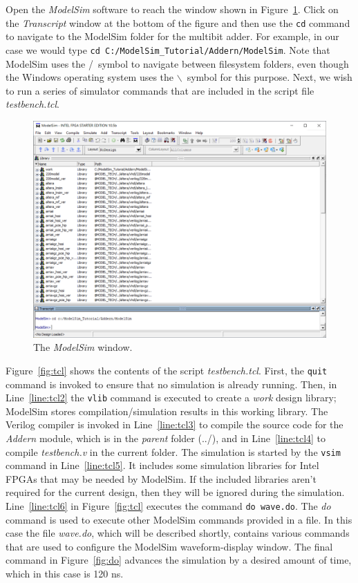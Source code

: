 \documentclass[11pt, twoside, pdftex]{article}
\begin{document}
\noindent
Open the {\it ModelSim} software to reach the window shown in Figure~\ref{fig:gui1}.
Click on the {\it Transcript} window at the bottom of the figure and then use the
\texttt{cd} command to navigate to the ModelSim folder for the multibit adder. For 
example, in our case we would type \texttt{cd C:/ModelSim\_Tutorial/Addern/ModelSim}. 
Note that ModelSim uses the /~symbol to navigate between filesystem folders, even though 
the Windows operating system uses the $\backslash$~symbol for this purpose.
Next, we wish to run a series of simulator commands that are included in the script file
{\it testbench.tcl}. 

\newpage
\begin{figure}[t]
	\begin{center}
		\includegraphics[width = .9\textwidth]{figures/gui1.png}
	\end{center}
		  \caption{The {\it ModelSim} window.}
	\label{fig:gui1}
\end{figure}

\noindent
Figure~\ref{fig:tcl} shows the contents of the script {\it testbench.tcl}. First, the
\texttt{quit} command is invoked to ensure that no simulation is already running. Then, in
Line~\ref{line:tcl2} the \texttt{vlib} command is executed to create a {\it work} design
library; ModelSim stores compilation/simulation results in this working library.   
The Verilog compiler is invoked in Line~\ref{line:tcl3} to
compile the source code for the {\it Addern} module, which is in the {\it parent} folder (../),  
and in Line~\ref{line:tcl4} to compile {\it testbench.v} in the current folder.
The simulation is started by the \texttt{vsim} command in Line~\ref{line:tcl5}. It includes some
simulation libraries for Intel FPGAs that may be needed by ModelSim.
If the included libraries aren't required for the current
design, then they will be ignored during the simulation. 
Line~\ref{line:tcl6} in Figure~\ref{fig:tcl} executes the command \texttt{do~wave.do}.
The {\it do} command is used to execute other ModelSim commands provided in a file. In
this case the file {\it wave.do}, which will be described shortly, contains various commands
that are used to configure the ModelSim waveform-display window. The final command in 
Figure~\ref{fig:do} advances the simulation by a desired amount of time, which in 
this case is 120 ns.
\end{document}
